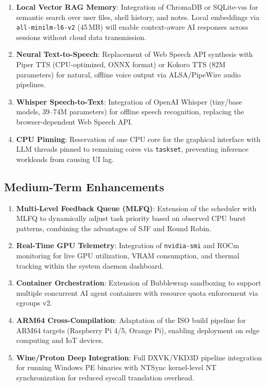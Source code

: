 \documentclass[conference]{IEEEtran}
\begin{document}
\begin{enumerate}
    \item \textbf{Local Vector RAG Memory}: Integration of ChromaDB or SQLite-vss for semantic search over user files, shell history, and notes. Local embeddings via \texttt{all-minilm-l6-v2} (45\,MB) will enable context-aware AI responses across sessions without cloud data transmission.
    
    \item \textbf{Neural Text-to-Speech}: Replacement of Web Speech API synthesis with Piper TTS (CPU-optimized, ONNX format) or Kokoro TTS (82M parameters) for natural, offline voice output via ALSA/PipeWire audio pipelines.
    
    \item \textbf{Whisper Speech-to-Text}: Integration of OpenAI Whisper \cite{radford2023whisper} (tiny/base models, 39--74M parameters) for offline speech recognition, replacing the browser-dependent Web Speech API.
    
    \item \textbf{CPU Pinning}: Reservation of one CPU core for the graphical interface with LLM threads pinned to remaining cores via \texttt{taskset}, preventing inference workloads from causing UI lag.
\end{enumerate}

\subsection{Medium-Term Enhancements}

\begin{enumerate}
    \item \textbf{Multi-Level Feedback Queue (MLFQ)}: Extension of the scheduler with MLFQ \cite{silberschatz2018os} to dynamically adjust task priority based on observed CPU burst patterns, combining the advantages of SJF and Round Robin.
    
    \item \textbf{Real-Time GPU Telemetry}: Integration of \texttt{nvidia-smi} and ROCm monitoring for live GPU utilization, VRAM consumption, and thermal tracking within the system daemon dashboard.
    
    \item \textbf{Container Orchestration}: Extension of Bubblewrap sandboxing to support multiple concurrent AI agent containers with resource quota enforcement via cgroups v2.
    
    \item \textbf{ARM64 Cross-Compilation}: Adaptation of the ISO build pipeline for ARM64 targets (Raspberry Pi 4/5, Orange Pi), enabling deployment on edge computing and IoT devices.
    
    \item \textbf{Wine/Proton Deep Integration}: Full DXVK/VKD3D pipeline integration for running Windows PE binaries with NTSync kernel-level NT synchronization for reduced syscall translation overhead.
\end{enumerate}
\end{document}
